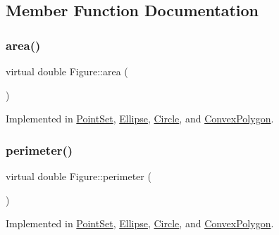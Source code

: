 \subsection{Member Function Documentation}
\mbox{\label{class_figure_a9860bda67fc9ce8127a812e167c4ce75}} 
\subsubsection{\texorpdfstring{area()}{area()}}
{\footnotesize\ttfamily virtual double Figure\+::area (\begin{DoxyParamCaption}{ }\end{DoxyParamCaption})\hspace{0.3cm}{\ttfamily [pure virtual]}}



Implemented in \hyperlink{class_point_set_aca8092b860a40743fb1c1189e8439764}{Point\+Set}, \hyperlink{class_ellipse_ad3de2759830df27c4ae1e65ecf46e7a1}{Ellipse}, \hyperlink{class_circle_a4f31d14f360b6e1f1acfb283ad65145a}{Circle}, and \hyperlink{class_convex_polygon_a4d8ca9c4d454308dcd95ae9f9dee2688}{Convex\+Polygon}.

\mbox{\label{class_figure_acae6802e2a55b322f7566f313d474546}} 
\subsubsection{\texorpdfstring{perimeter()}{perimeter()}}
{\footnotesize\ttfamily virtual double Figure\+::perimeter (\begin{DoxyParamCaption}{ }\end{DoxyParamCaption})\hspace{0.3cm}{\ttfamily [pure virtual]}}



Implemented in \hyperlink{class_point_set_a82b83d662bd5570e6e049e120e1c6bac}{Point\+Set}, \hyperlink{class_ellipse_a367ca002c3a95761d0b913f98bc4eb6e}{Ellipse}, \hyperlink{class_circle_ab0a4db4a814591918b0372feac5df46b}{Circle}, and \hyperlink{class_convex_polygon_ac8e11403c36adb4ac51b6c169257b605}{Convex\+Polygon}.

\mbox{\label{class_figure_a11994f67ee209a46047e0897680f6313}} 
